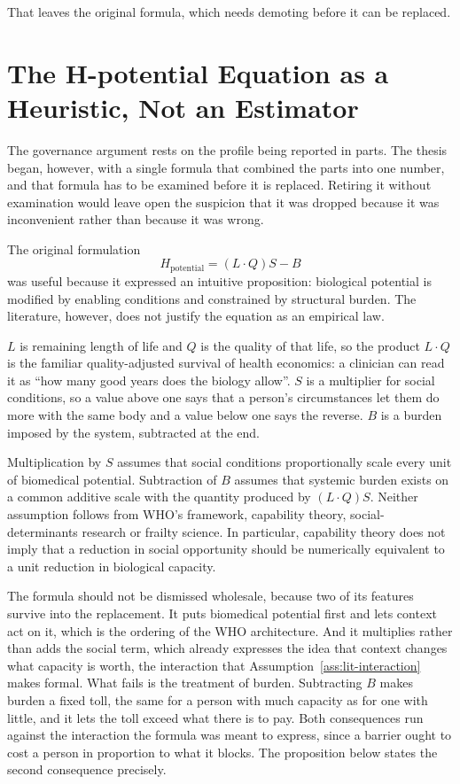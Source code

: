 That leaves the original formula, which needs demoting before it can be
replaced.

\section{The H-potential Equation as a Heuristic, Not an Estimator}
\label{sec:lit-heuristic}

The governance argument rests on the profile being reported in parts. The thesis began, however, with a single formula that combined the parts into one number, and that formula has to be examined before it is replaced. Retiring it without examination would leave open the suspicion that it was dropped because it was inconvenient rather than because it was wrong.

The original formulation
\begin{equation}
H_{\text{potential}}=(L\cdot Q)S-B
\end{equation}
was useful because it expressed an intuitive proposition: biological potential is modified by enabling conditions and constrained by structural burden. The literature, however, does not justify the equation as an empirical law.

$L$ is remaining length of life and $Q$ is the quality of that life, so the
product $L\cdot Q$ is the familiar quality-adjusted survival of health
economics: a clinician can read it as ``how many good years does the biology
allow''. $S$ is a multiplier for social conditions, so a value above one says
that a person's circumstances let them do more with the same body and a value
below one says the reverse. $B$ is a burden imposed by the system, subtracted
at the end.

Multiplication by $S$ assumes that social conditions proportionally scale every unit of biomedical potential. Subtraction of $B$ assumes that systemic burden exists on a common additive scale with the quantity produced by $(L\cdot Q)S$. Neither assumption follows from WHO's framework, capability theory, social-determinants research or frailty science. In particular, capability theory does not imply that a reduction in social opportunity should be numerically equivalent to a unit reduction in biological capacity.

The formula should not be dismissed wholesale, because two of its features survive into the replacement. It puts biomedical potential first and lets context act on it, which is the ordering of the WHO architecture. And it multiplies rather than adds the social term, which already expresses the idea that context changes what capacity is worth, the interaction that Assumption~\ref{ass:lit-interaction} makes formal. What fails is the treatment of burden. Subtracting $B$ makes burden a fixed toll, the same for a person with much capacity as for one with little, and it lets the toll exceed what there is to pay. Both consequences run against the interaction the formula was meant to express, since a barrier ought to cost a person in proportion to what it blocks. The proposition below states the second consequence precisely.

